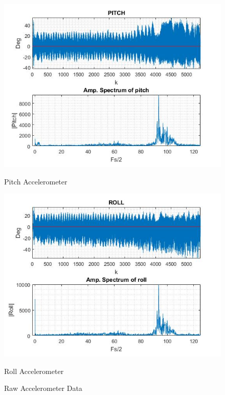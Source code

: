 \begin{figure}[H]
        \centering
            \begin{minipage}[b]{0.49\textwidth}
                \includegraphics[width = \textwidth, angle= 0]{VAPIQ-PICTURES/PITCHacc.jpg}
                \caption{Pitch Accelerometer}
                \label{fig:PitchAcc}
            \end{minipage}
            \hfill
            \begin{minipage}[b]{0.49\textwidth}
                \includegraphics[width =\textwidth, angle =0]{VAPIQ-PICTURES/ROLLacc.jpg}
                \caption{Roll Accelerometer}
                \label{fig:RollAcc}
            \end{minipage}
\caption{Raw Accelerometer Data}
\end{figure}
